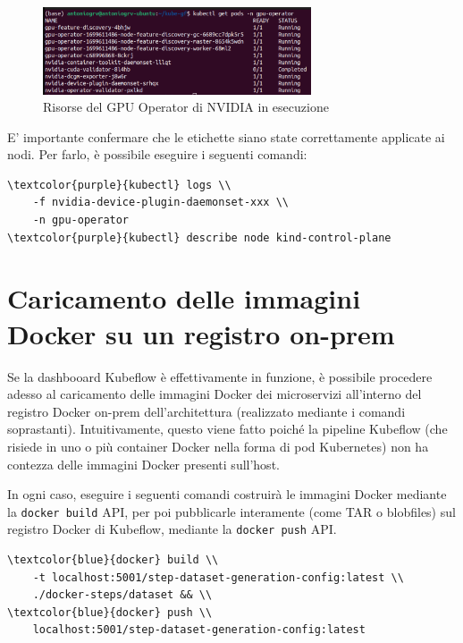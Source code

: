 \begin{figure}[h]
    \centering
    \includegraphics[width=300px]{figures/ch4and5/gpu.png}
    \caption[Risorse del GPU Operator di NVIDIA in esecuzione]{Risorse del GPU Operator di NVIDIA in esecuzione}
    \label{fig:cha6:gpu}
\end{figure}

E' importante confermare che le etichette siano state correttamente applicate ai nodi. Per farlo, è possibile eseguire i seguenti comandi:

\begin{small}
\begin{Verbatim}[commandchars=\\\{\}]
\textcolor{purple}{kubectl} logs \\
    -f nvidia-device-plugin-daemonset-xxx \\
    -n gpu-operator
\textcolor{purple}{kubectl} describe node kind-control-plane
\end{Verbatim}
\end{small}

\section{Caricamento delle immagini Docker su un registro on-prem}

Se la dashbooard Kubeflow è effettivamente in funzione, è possibile procedere adesso al caricamento delle immagini Docker dei microservizi all'interno del registro Docker on-prem dell'architettura (realizzato mediante i comandi soprastanti). Intuitivamente, questo viene fatto poiché la pipeline Kubeflow (che risiede in uno o più container Docker nella forma di pod Kubernetes) non ha contezza delle immagini Docker presenti sull'host.

In ogni caso, eseguire i seguenti comandi costruirà le immagini Docker mediante la {\small \verb|docker build|} API, per poi pubblicarle interamente (come TAR o blobfiles) sul registro Docker di Kubeflow, mediante la {\small \verb|docker push|} API.

\begin{small}
\begin{Verbatim}[commandchars=\\\{\}]
\textcolor{blue}{docker} build \\
    -t localhost:5001/step-dataset-generation-config:latest \\
    ./docker-steps/dataset && \\
\textcolor{blue}{docker} push \\
    localhost:5001/step-dataset-generation-config:latest
\end{Verbatim}
\end{small}

